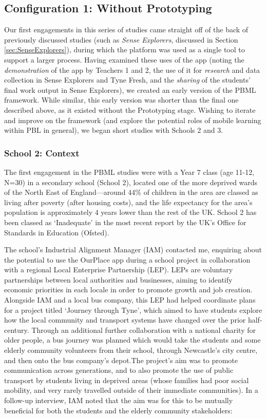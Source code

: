 \subsection{Configuration 1: Without Prototyping}
Our first engagements in this series of studies came straight off of the back of previously discussed studies (such as \textit{Sense Explorers}, discussed in Section \ref{sec:SenseExplorers}), during which the platform was used as a single tool to support a larger process. Having examined these uses of the app (noting the \textit{demonstration} of the app by Teachers 1 and 2, the use of it for \textit{research} and data collection in Sense Explorers and Tyne Fresh, and the \textit{sharing} of the students' final work output in Sense Explorers), we created an early version of the PBML framework. While similar, this early version was shorter than the final one described above, as it existed without the Prototyping stage. Wishing to iterate and improve on the framework (and explore the potential roles of mobile learning within PBL in general), we began short studies with Schools 2 and 3.

\subsubsection{School 2: Context}
The first engagement in the PBML studies were with a Year 7 class (age 11-12, N=30) in a secondary school (School 2), located one of the more deprived wards of the North East of England---around 44\% of children in the area are classed as living after poverty (after housing costs), and the life expectancy for the area's population is approximately 4 years lower than the rest of the UK. School 2 has been classed as `Inadequate' in the most recent report by the UK's Office for Standards in Education (Ofsted).

The school's Industrial Alignment Manager (IAM) contacted me, enquiring about the potential to use the OurPlace app during a school project in collaboration with a regional Local Enterprise Partnership (LEP). LEPs are voluntary partnerships between local authorities and businesses, aiming to identify economic priorities in each locale in order to promote growth and job creation. Alongside IAM and a local bus company, this LEP had helped coordinate plans for a project titled `Journey through Tyne', which aimed to have students explore how the local community and transport systems have changed over the prior half-century. Through an additional further collaboration with a national charity for older people, a bus journey was planned which would take the students and some elderly community volunteers from their school, through Newcastle's city centre, and then onto the bus company's depot.The project's aim was to promote communication across generations, and to also promote the use of public transport by students living in deprived areas (whose families had poor social mobility, and very rarely travelled outside of their immediate communities). In a follow-up interview, IAM noted that the aim was for this to be mutually beneficial for both the students and the elderly community stakeholders:

